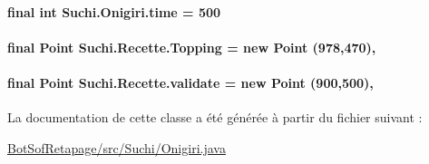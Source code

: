 \paragraph[{time}]{\setlength{\rightskip}{0pt plus 5cm}final int Suchi.\+Onigiri.\+time = 500\hspace{0.3cm}{\ttfamily [private]}}\label{classSuchi_1_1Onigiri_a5b8da19f340d4f7e1909f002e12af16e}
\hypertarget{classSuchi_1_1Recette_a4810b2254c050209fba27757066668b3}{}
\paragraph[{Topping}]{\setlength{\rightskip}{0pt plus 5cm}final Point Suchi.\+Recette.\+Topping = new Point (978,470)\hspace{0.3cm}{\ttfamily [protected]}, {\ttfamily [inherited]}}\label{classSuchi_1_1Recette_a4810b2254c050209fba27757066668b3}
\hypertarget{classSuchi_1_1Recette_aff16265c9b0b819091af71f64ef84be7}{}
\paragraph[{validate}]{\setlength{\rightskip}{0pt plus 5cm}final Point Suchi.\+Recette.\+validate = new Point (900,500)\hspace{0.3cm}{\ttfamily [protected]}, {\ttfamily [inherited]}}\label{classSuchi_1_1Recette_aff16265c9b0b819091af71f64ef84be7}


La documentation de cette classe a été générée à partir du fichier suivant \+:\begin{DoxyCompactItemize}
\item 
\hyperlink{BotSofRetapage_2src_2Suchi_2Onigiri_8java}{Bot\+Sof\+Retapage/src/\+Suchi/\+Onigiri.\+java}\end{DoxyCompactItemize}
